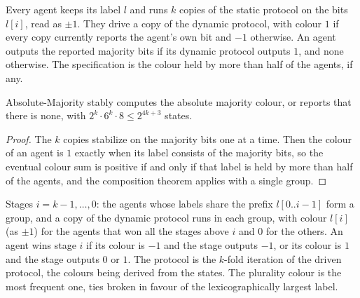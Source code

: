 \begin{definition}\label{def:em-absolute}
\leanok{}
Every agent keeps its label $l$ and runs $k$ copies of the static protocol on the bits $l[i]$,
read as $\pm 1$. They drive a copy of the dynamic protocol, with colour $1$ if every copy currently
reports the agent's own bit and $-1$ otherwise. An agent outputs the reported majority bits if its
dynamic protocol outputs $1$, and none otherwise. The specification is the colour held by more
than half of the agents, if any.
\end{definition}

\begin{theorem}\label{thm:em-absolute}
\leanok{}
Absolute-Majority stably computes the absolute majority colour, or reports that there is none,
with $2^k \cdot 6^k \cdot 8 \le 2^{4k+3}$ states.
\end{theorem}
\begin{proof}\leanok
The $k$ copies stabilize on the majority bits one at a time. Then the colour of an agent is $1$
exactly when its label consists of the majority bits, so the eventual colour sum is positive if
and only if that label is held by more than half of the agents, and the composition theorem
applies with a single group.
\end{proof}

\begin{definition}\label{def:em-relative}
\leanok{}
Stages $i = k - 1, \dots, 0$: the agents whose labels share the prefix $l[0..i-1]$ form a group,
and a copy of the dynamic protocol runs in each group, with colour $l[i]$ (as $\pm 1$) for the
agents that won all the stages above $i$ and $0$ for the others. An agent wins stage $i$ if its
colour is $-1$ and the stage outputs $-1$, or its colour is $1$ and the stage outputs $0$ or $1$.
The protocol is the $k$-fold iteration of the driven protocol, the colours being derived from the
states. The plurality colour is the most frequent one, ties broken in favour of the
lexicographically largest label.
\end{definition}

